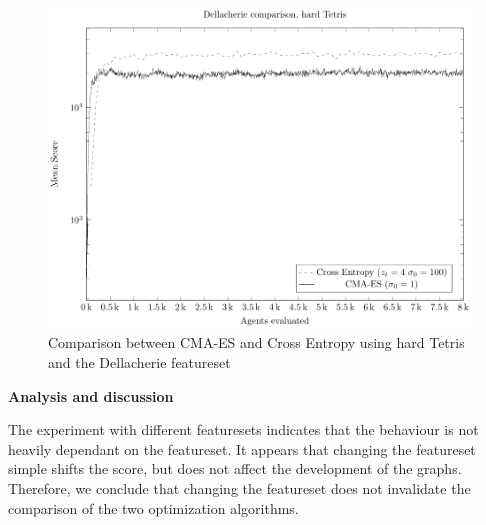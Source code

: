 \begin{figure}[H]
\includegraphics[scale=1]{plots/plotDellCmaVsCEHardTetris}
\caption{Comparison between CMA-ES and Cross Entropy 
using hard Tetris and the Dellacherie featureset
\label{fig:featuresetCompareDellacherie}}
\end{figure}

\textbf{Analysis and discussion}

The experiment with different featuresets indicates that the behaviour 
is not heavily dependant on the featureset.
It appears that changing the featureset simple shifts the score, but does not affect the development of the graphs.\\
Therefore, we conclude that changing the featureset does not invalidate
the comparison of the two optimization algorithms.

